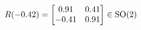 \documentclass[preview]{standalone}
\begin{document}
\begin{align*}
\special{dvisvgm:raw <g id='unique000'>}R(-0.42) = \begin{bmatrix} 0.91 & 0.41 \\ -0.41 & 0.91 \end{bmatrix} \in \text{SO}(2)\special{dvisvgm:raw </g>}
\end{align*}
\end{document}
